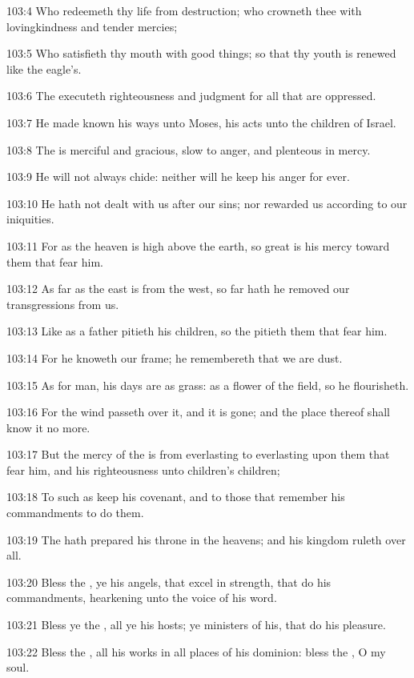 103:4 Who redeemeth thy life from destruction; who crowneth thee with lovingkindness and tender mercies;

103:5 Who satisfieth thy mouth with good things; so that thy youth is renewed like the eagle's.

103:6 The \LORD executeth righteousness and judgment for all that are oppressed.

103:7 He made known his ways unto Moses, his acts unto the children of Israel.

103:8 The \LORD is merciful and gracious, slow to anger, and plenteous in mercy.

103:9 He will not always chide: neither will he keep his anger for ever.

103:10 He hath not dealt with us after our sins; nor rewarded us according to our iniquities.

103:11 For as the heaven is high above the earth, so great is his mercy toward them that fear him.

103:12 As far as the east is from the west, so far hath he removed our transgressions from us.

103:13 Like as a father pitieth his children, so the \LORD pitieth them that fear him.

103:14 For he knoweth our frame; he remembereth that we are dust.

103:15 As for man, his days are as grass: as a flower of the field, so he flourisheth.

103:16 For the wind passeth over it, and it is gone; and the place thereof shall know it no more.

103:17 But the mercy of the \LORD is from everlasting to everlasting upon them that fear him, and his righteousness unto children's children;

103:18 To such as keep his covenant, and to those that remember his commandments to do them.

103:19 The \LORD hath prepared his throne in the heavens; and his kingdom ruleth over all.

103:20 Bless the \LORD, ye his angels, that excel in strength, that do his commandments, hearkening unto the voice of his word.

103:21 Bless ye the \LORD, all ye his hosts; ye ministers of his, that do his pleasure.

103:22 Bless the \LORD, all his works in all places of his dominion: bless the \LORD, O my soul.



